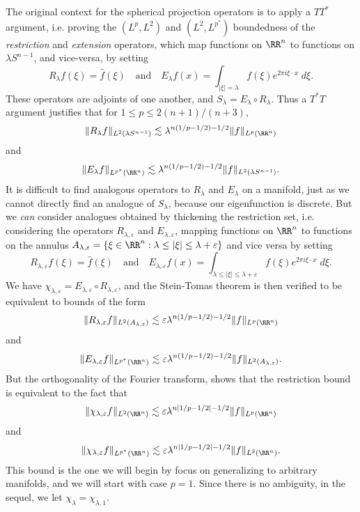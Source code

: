 The original context for the spherical projection operators is to apply a $TT^*$ argument, i.e. proving the $(L^p,L^2)$ and $(L^2,L^{p^*})$ boundedness of the \emph{restriction} and \emph{extension} operators, which map functions on $\RR^n$ to functions on $\lambda S^{n-1}$, and vice-versa, by setting
%
\[ R_\lambda f(\xi) = \widehat{f}(\xi) \quad\text{and}\quad E_\lambda f(x) = \int_{|\xi| = \lambda} f(\xi) e^{2 \pi i \xi \cdot x}\; d\xi. \]
%
These operators are adjoints of one another, and $S_\lambda = E_\lambda \circ R_\lambda$. Thus a $T^*T$ argument justifies that for $1 \leq p \leq 2(n+1)/(n+3)$,
%
\[ \| R_\lambda f \|_{L^2(\lambda S^{n-1})} \lesssim \lambda^{n(1/p - 1/2) - 1/2} \| f \|_{L^p(\RR^n)} \]
%
and
%
\[ \| E_\lambda f \|_{L^{p^*}(\RR^n)} \lesssim \lambda^{n(1/p - 1/2) - 1/2} \| f \|_{L^2(\lambda S^{n-1})}. \]
%
It is difficult to find analogous operators to $R_\lambda$ and $E_\lambda$ on a manifold, just as we cannot directly find an analogue of $S_\lambda$, because our eigenfunction is discrete. But we \emph{can} consider analogues obtained by thickening the restriction set, i.e. considering the operators $R_{\lambda,\varepsilon}$ and $E_{\lambda,\varepsilon}$, mapping functions on $\RR^n$ to functions on the annulus $A_{\lambda,\varepsilon} = \{ \xi \in \RR^n: \lambda \leq |\xi| \leq \lambda + \varepsilon \}$ and vice versa by setting
%
\[ R_{\lambda,\varepsilon} f(\xi) = \widehat{f}(\xi) \quad\text{and}\quad E_{\lambda,\varepsilon} f(x) = \int_{\lambda \leq |\xi| \leq \lambda + \varepsilon} f(\xi) e^{2 \pi i \xi \cdot x}\; d\xi. \]
%
We have $\chi_{\lambda,\varepsilon} = E_{\lambda,\varepsilon} \circ R_{\lambda,\varepsilon}$, and the Stein-Tomas theorem is then verified to be equivalent to bounds of the form
%
\[ \| R_{\lambda,\varepsilon} f \|_{L^2(A_{\lambda,\varepsilon})} \lesssim \varepsilon \lambda^{n(1/p - 1/2) - 1/2} \| f \|_{L^p(\RR^n)} \]
%
and
%
\[ \| E_{\lambda,\varepsilon} f \|_{L^{p^*}(\RR^n)} \lesssim \varepsilon \lambda^{n(1/p - 1/2) - 1/2} \| f \|_{L^2(A_{\lambda,\varepsilon})}. \]
%
But the orthogonality of the Fourier transform, shows that the restriction bound is equivalent to the fact that
%
\[ \| \chi_{\lambda,\varepsilon} f \|_{L^2(\RR^n)} \lesssim \varepsilon \lambda^{n|1/p - 1/2| - 1/2} \| f \|_{L^p(\RR^n)} \]
%
and
%
\[ \| \chi_{\lambda,\varepsilon} f \|_{L^{p^*}(\RR^n)} \lesssim \varepsilon \lambda^{n|1/p - 1/2| - 1/2} \| f \|_{L^2(\RR^n)}. \]
%
This bound is the one we will begin by focus on generalizing to arbitrary manifolds, and we will start with case $p = 1$. Since there is no ambiguity, in the sequel, we let $\chi_\lambda = \chi_{\lambda,1}$.

